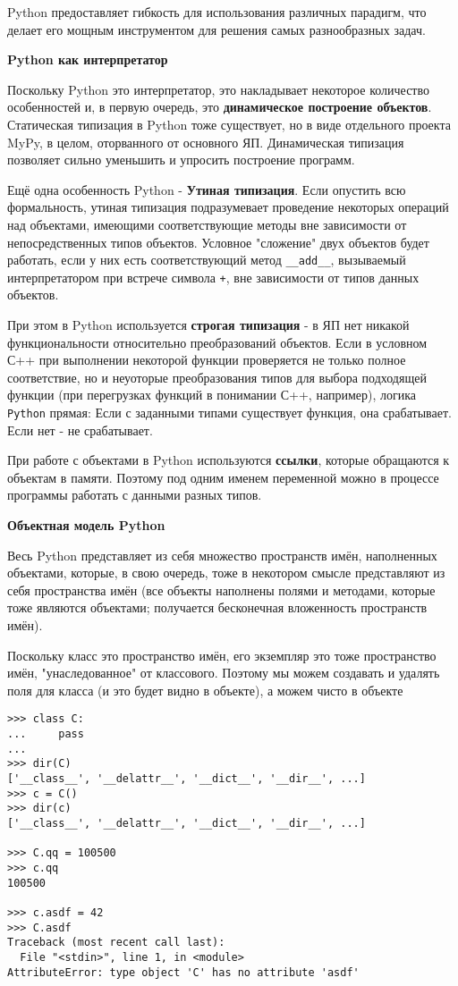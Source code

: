 Python предоставляет гибкость для использования различных парадигм, что делает его мощным инструментом для решения самых разнообразных задач.


\textbf{Python как интерпретатор}

Поскольку Python это интерпретатор, это накладывает некоторое количество особенностей и, в первую очередь, это \textbf{динамическое построение объектов}. Статическая типизация в Python тоже существует, но в виде отдельного проекта MyPy, в целом, оторванного от основного ЯП. Динамическая типизация позволяет сильно уменьшить и упросить построение программ.

Ещё одна особенность Python - \textbf{Утиная типизация}. Если опустить всю формальность, утиная типизация подразумевает проведение некоторых операций над объектами, имеющими соответствующие методы вне зависимости от непосредственных типов объектов. Условное "сложение" двух объектов будет работать, если у них есть соответствующий метод \verb!__add__!, вызываемый интерпретатором при встрече символа \verb!+!, вне зависимости от типов данных объектов.

При этом в Python используется \textbf{строгая типизация} - в ЯП нет никакой функциональности относительно преобразований объектов. Если в условном С++ при выполнении некоторой функции проверяется не только полное соответствие, но и неуоторые преобразования типов для выбора подходящей функции (при перегрузках функций в понимании С++, например), логика \verb!Python! прямая: Если с заданными типами существует функция, она срабатывает. Если нет - не срабатывает.

При работе с объектами в Python используются \textbf{ссылки}, которые обращаются к объектам в памяти. Поэтому под одним именем переменной можно в процессе программы работать с данными разных типов.

\textbf{Объектная модель Python}

Весь Python представляет из себя множество пространств имён, наполненных объектами, которые, в свою очередь, тоже в некотором смысле представляют из себя пространства имён (все объекты наполнены полями и методами, которые тоже являются объектами; получается бесконечная вложенность пространств имён).

Поскольку класс это пространство имён, его экземпляр это тоже пространство имён, "унаследованное" от классового. Поэтому мы можем создавать и удалять поля для класса (и это будет видно в объекте), а можем чисто в объекте

\begin{verbatim}
>>> class C:
...     pass
...
>>> dir(C)
['__class__', '__delattr__', '__dict__', '__dir__', ...]
>>> c = C()
>>> dir(c)
['__class__', '__delattr__', '__dict__', '__dir__', ...]

>>> C.qq = 100500
>>> c.qq
100500

>>> c.asdf = 42
>>> C.asdf
Traceback (most recent call last):
  File "<stdin>", line 1, in <module>
AttributeError: type object 'C' has no attribute 'asdf'
\end{verbatim}

